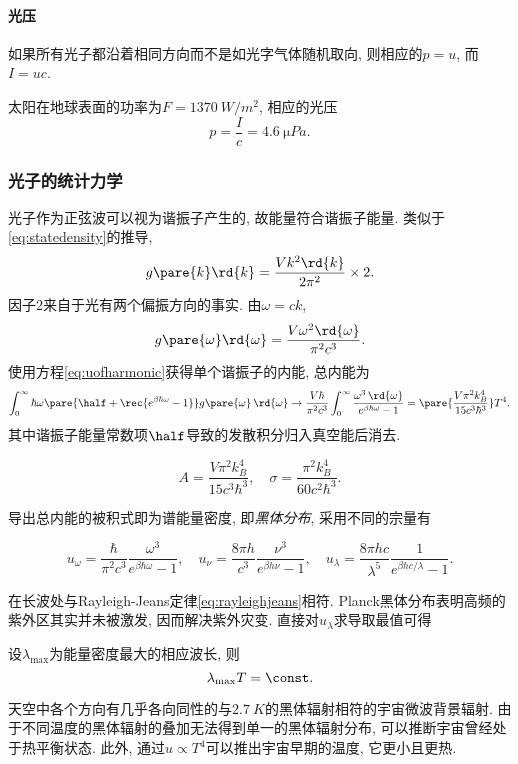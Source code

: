 \documentclass[../Thermal.tex]{subfiles}
\begin{document}
\paragraph{光压} 如果所有光子都沿着相同方向而不是如光字气体随机取向, 则相应的$p=u$, 而$I=uc$.
\begin{ex}
太阳在地球表面的功率为$F=\SI{1370}{W/m^2}$, 相应的光压
\[  p = \frac{I}{c} = \SI{4.6}{\micro Pa}. \]
\end{ex}
\subsubsection{光子的统计力学}
光子作为正弦波可以视为谐振子产生的, 故能量符合谐振子能量. 类似于\eqref{eq:statedensity}的推导,
\[ g\pare{k}\rd{k} = \frac{Vk^2\rd{k}}{2\pi^2}\times 2. \]
因子$2$来自于光有两个偏振方向的事实. 由$\omega = ck$,
\[ g\pare{\omega}\rd{\omega} = \frac{V\omega^2\rd{\omega}}{\pi^2c^3}. \]
使用方程\eqref{eq:uofharmonic}获得单个谐振子的内能, 总内能为
\[ \int_0^\infty \hbar\omega\pare{\half + \rec{e^{\beta \hbar \omega} - 1}} g\pare{\omega}\,\rd{\omega} \rightarrow \frac{V\hbar}{\pi^2 c^3}\int_0^\infty \frac{\omega^3\,\rd{\omega}}{e^{\beta\hbar\omega} - 1} = \pare{\frac{V\pi^2k_B^4}{15c^3\hbar^3}}T^4. \]
其中谐振子能量常数项$\half$导致的发散积分归入真空能后消去.
\begin{finale}
\begin{equation}
\label{eq:Aandsigma}
A = \frac{V\pi^2k_B^4}{15c^3\hbar^3},\quad \sigma = \frac{\pi^2k_B^4}{60c^2\hbar^3}.
\end{equation}
\end{finale}
导出总内能的被积式即为谱能量密度, 即\emph{黑体分布}, 采用不同的宗量有
\begin{theorem}[Planck黑体辐射定律]
\[ u_\omega = \frac{\hbar}{\pi^2c^3}\frac{\omega^3}{e^{\beta \hbar\omega} - 1},\quad u_\nu = \frac{8\pi h}{c^3}\frac{\nu^3}{e^{\beta h \nu} - 1},\quad u_\lambda = \frac{8\pi hc}{\lambda^5}\frac{1}{e^{\beta hc/\lambda} - 1}. \]
\end{theorem}
在长波处与Rayleigh-Jeans定律\eqref{eq:rayleighjeans}相符. Planck黑体分布表明高频的紫外区其实并未被激发, 因而解决紫外灾变. 直接对$u_\lambda$求导取最值可得
\begin{corollary}[Wien定律]
设$\lambda_{\mathrm{max}}$为能量密度最大的相应波长, 则
\[ \lambda_{\mathrm{max}} T = \const. \]
\end{corollary}
\begin{ex}[宇宙微波背景辐射]
天空中各个方向有几乎各向同性的与$\SI{2.7}{K}$的黑体辐射相符的宇宙微波背景辐射. 由于不同温度的黑体辐射的叠加无法得到单一的黑体辐射分布, 可以推断宇宙曾经处于热平衡状态. 此外, 通过$u\propto T^4$可以推出宇宙早期的温度, 它更小且更热.
\end{ex}
\end{document}
